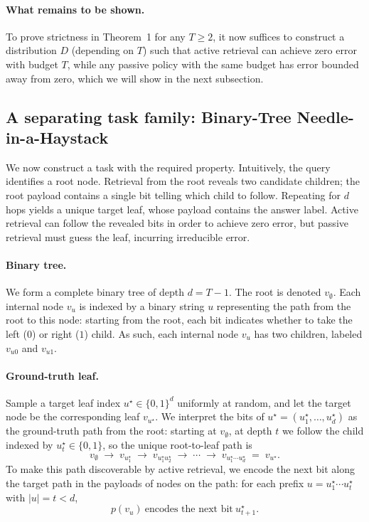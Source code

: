 \documentclass{llmxive}
\begin{document}
\paragraph{What remains to be shown.} To prove strictness in Theorem~1 for any \(T\ge 2\), it now suffices to construct a distribution \(D\) (depending on \(T\)) such that active retrieval can achieve zero error with budget \(T\), while any passive policy with the same budget has error bounded away from zero, which we will show in the next subsection.

\subsection{A separating task family: Binary-Tree Needle-in-a-Haystack}

We now construct a task with the required property. Intuitively, the query identifies a root node.
Retrieval from the root reveals two candidate children; the root payload contains a single
bit telling which child to follow. Repeating for \(d\) hops yields a unique target leaf,
whose payload contains the answer label. Active retrieval can follow the revealed bits in order to achieve zero error, but passive retrieval must guess the leaf, incurring irreducible error.

\paragraph{Binary tree.}
We form a complete binary tree of depth $d = T-1$. The root is denoted $v_\emptyset$. Each internal node $v_u$ is indexed by a binary string $u$ representing the path from the root to this node: starting from the root, each bit indicates whether to take the left ($0$) or right ($1$) child. As such, each internal node $v_u$ has two children, labeled $v_{u0}$ and $v_{u1}$.

\paragraph{Ground-truth leaf.}
Sample a target leaf index \(u^\star \in \{0,1\}^d\) uniformly at random, and let the target node be the corresponding
leaf \(v_{u^\star}\). We interpret the bits of \(u^\star = (u^\star_1,\dots,u^\star_d)\) as the ground-truth path from
the root: starting at \(v_\emptyset\), at depth \(t\) we follow the child indexed by \(u^\star_t \in \{0,1\}\), so the
unique root-to-leaf path is
\[
v_\emptyset \;\to\; v_{u^\star_1} \;\to\; v_{u^\star_1u^\star_2} \;\to\; \cdots \;\to\; v_{u^\star_1\cdots u^\star_d}
\;=\; v_{u^\star}.
\]
To make this path discoverable by active retrieval, we encode the next bit along the target path in
the payloads of nodes on the path: for each prefix \(u = u^\star_1\cdots u^\star_t\) with \(|u|=t<d\),
\[
p(v_u)\ \text{encodes the next bit}\ u^\star_{t+1}.
\]
\end{document}
